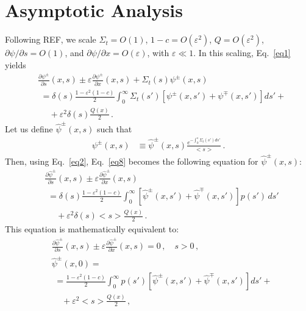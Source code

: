 \documentclass{anstrans}
\newcommand{\bl}{\big<}
\newcommand{\bg}{\big>}
\newcommand{\eps}{\varepsilon}
\begin{document}
\section{Asymptotic Analysis}
Following REF,  we scale $\Sigma_t = O(1)$, 
$ 1-c = O(\varepsilon^2) $, $Q=O(\varepsilon^2)$,  $\partial \psi / \partial s = O(1)$, and $\partial \psi/\partial x = O(\eps)$, with $\varepsilon \ll 1$. In this scaling, Eq.\ \eqref{eq1} yields
  \begin{align}
    &\frac{\partial \psi^\pm}{\partial s}  (x,s) 
      \pm \eps\frac{\partial\psi^\pm}{\partial x}(x, s)
       + \Sigma_t(s) \psi^\pm( x, s)   \label{eq8}\\
   & \,\,= \delta(s)\frac{1-\eps^2(1-c)}{2}\int_0^{\infty}\Sigma_t(s') 
      \left[\psi^\pm(x, s')+\psi^\mp(x,s')\right]ds' + \nonumber \\
     &\,\,\,\,\,\,\,\, + \varepsilon^2 \delta(s)\frac{Q(x)}{2} \,.
 \nonumber
  \end{align}
Let us define $\hat\psi^\pm(x, s)$ such that
  \begin{align}\label{eq9}
   \psi^\pm( x,s) &\equiv 
          \hat\psi^\pm(x,s) \frac{e^{-\int_0^s \Sigma_t(s') ds'}}{\bl s\bg}\,.
  \end{align}
Then, using Eq.\ \eqref{eq2}, Eq.\ \eqref{eq8} becomes the following equation for $\hat\psi^\pm(x, s)$:
  \begin{align}\label{eq10}
    &\frac{\partial \hat\psi^\pm}{\partial s} (x,s) 
      \pm \varepsilon \frac{\partial\hat\psi^\pm}{\partial x}(x, s)  \\
   & \,\,= \delta(s)\frac{1-\eps^2(1-c)}{2} \int_0^{\infty} \left[
      \hat\psi^\pm(x, s')+\hat\psi^\mp(x,s')\right] p(s') \, ds'\nonumber\\
      & \,\,\,\,\,\,\,\,
      + \varepsilon^2 \delta(s) \bl s\bg \frac{Q(x)}{2} \,.\nonumber 
  \end{align}
This equation is mathematically equivalent to:
   \begin{subequations}
   \begin{align}
      &\frac{\partial \hat\psi^\pm}{\partial s} (x,s) 
         \pm \varepsilon \frac{\partial\hat\psi^\pm}{\partial x}(x, s) = 0 \,, \quad s > 0 \,,\label{eq11a}\\
       &\hat\psi^\pm(x, 0)  =\\
       &\,\,=\frac{1-\eps^2(1-c)}{2} \int_0^{\infty} p(s')
\left[\hat\psi^\pm(x ,s')+\hat\psi^\mp(x ,s')\right] ds' + \nonumber\\
         &\,\,\,\,\,\,\, + \varepsilon^2 \bl s\bg \frac{Q(x)}{2} \,,\nonumber
   \end{align}
   \end{subequations}
\end{document}
